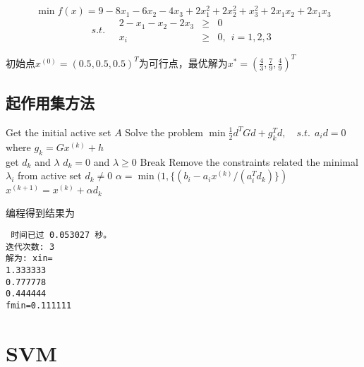 \documentclass[11pt,a4paper]{article}
\begin{document}
\[\min f(x)=9-8x_1-6x_2-4x_3+2x_1^2+2x_2^2+x_3^2+2x_1x_2+2x_1x_3\]
\[s.t.\quad\begin{array}{rcl}
2-x_1-x_2-2x_3 & \ge & 0\\
x_i & \ge & 0,~~i=1,2,3
\end{array}\]

初始点$x^{(0)}=(0.5,0.5,0.5)^T$为可行点，最优解为$x^*=(\frac{4}{3},\frac{7}{9},\frac{4}{9})^T$

\subsection{起作用集方法}

\begin{codebox}
	\li Get the initial active set $A$
	\li Solve the problem \(\min \frac{1}{2}d^TGd+g_k^Td,\quad s.t.~~a_id=0\)\\
		where $g_k=Gx^{(k)}+h$\\
		get $d_k$ and $\lambda$
	\li \If $d_k=0$ and $\lambda \ge 0$
	\li		\Then	Break
	\li		\Else Remove the constraints related the minimal $\lambda_i$ from active set
	 	\End
	\li \If $d_k\neq 0$
	\li 	\Then $\alpha = \min (1, \{(b_i-a_ix^{(k)}/(a_i^Td_k)\})$
	\li			 $x^{(k+1)}=x^{(k)}+\alpha d_k$
	\li 		{}
		\End
\end{codebox}

编程得到结果为

\noindent\texttt{
	时间已过 0.053027 秒。\\
	迭代次数: 3\\
	解为: xin=\\
	1.333333\\
	0.777778\\
	0.444444\\
	fmin=0.111111
}

\section{SVM}
\end{document}
